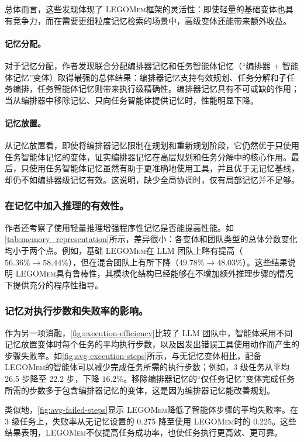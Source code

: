 \documentclass[10pt,twocolumn]{article}
\newcommand{\legomem}{\textsc{LEGOMem}}
\begin{document}
总体而言，这些发现体现了 \legomem 框架的灵活性：即使轻量的基础变体也具有竞争力，而在需要更细粒度记忆检索的场景中，高级变体还能带来额外收益。

\paragraph{记忆分配。}
对于记忆分配，作者发现联合分配编排器记忆和任务智能体记忆（“编排器 + 智能体记忆”变体）取得最强的总体结果：编排器记忆支持有效规划、任务分解和子任务编排，任务智能体记忆则带来执行级精确性。编排器记忆具有不可或缺的作用；当从编排器中移除记忆、只向任务智能体提供记忆时，性能明显下降。

\paragraph{记忆放置。}
从记忆放置看，即使将编排器记忆限制在规划和重新规划阶段，它仍然优于只使用任务智能体记忆的变体，证实编排器记忆在高层规划和任务分解中的核心作用。最后，只使用任务智能体记忆虽然有助于更准确地使用工具，并且优于无记忆基线，却仍不如编排器级记忆有效。这说明，缺少全局协调时，仅有局部记忆并不足够。

\subsubsection{在记忆中加入推理的有效性。}
作者还考察了使用轻量推理增强程序性记忆是否能提高性能。如\autoref{tab:memory_representation}所示，差异很小：各变体和团队类型的总体分数变化均小于两个点。例如，基础 \legomem 在 LLM 团队上略有提高（$56.36\%\rightarrow58.44\%$），但在混合团队上有所下降（$49.78\%\rightarrow48.03\%$）。这些结果说明 \legomem 具有鲁棒性，其模块化结构已经能够在不增加额外推理步骤的情况下提供充分的程序性指导。

\subsubsection{记忆对执行步数和失败率的影响。}
作为另一项消融，\autoref{fig:execution-efficiency}比较了 LLM 团队中，智能体采用不同记忆放置变体时每个任务的平均执行步数，以及因发出错误工具使用动作而产生的步骤失败率。如\autoref{fig:avg-execution-steps}所示，与无记忆变体相比，配备 \legomem 的智能体可以减少完成任务所需的执行步数；例如，3 级任务从平均 26.5 步降至 22.2 步，下降 $16.2\%$。移除编排器记忆的“仅任务记忆”变体完成任务所需的步数多于包含编排器记忆的变体，这是因为编排器记忆能改善规划。

类似地，\autoref{fig:avg-failed-steps}显示 \legomem 降低了智能体步骤的平均失败率。在 3 级任务上，失败率从无记忆设置的 0.275 降至使用 \legomem 时的 0.225。这些结果表明，\legomem 不仅提高任务成功率，也使任务执行更高效、更可靠。
\end{document}
